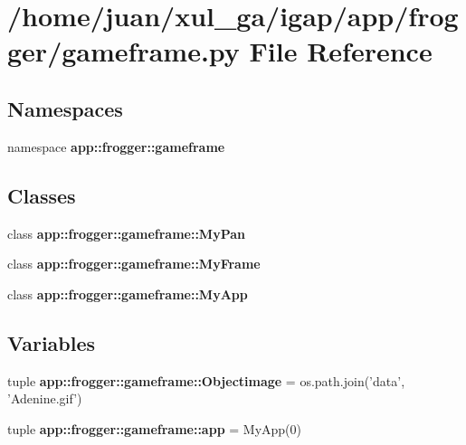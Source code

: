 \section{/home/juan/xul\_\-ga/igap/app/frogger/gameframe.py File Reference}
\label{gameframe_8py}
\subsection*{Namespaces}
\begin{CompactItemize}
\item 
namespace {\bf app::frogger::gameframe}
\end{CompactItemize}
\subsection*{Classes}
\begin{CompactItemize}
\item 
class {\bf app::frogger::gameframe::MyPan}
\item 
class {\bf app::frogger::gameframe::MyFrame}
\item 
class {\bf app::frogger::gameframe::MyApp}
\end{CompactItemize}
\subsection*{Variables}
\begin{CompactItemize}
\item 
tuple {\bf app::frogger::gameframe::Objectimage} = os.path.join('data', 'Adenine.gif')
\item 
tuple {\bf app::frogger::gameframe::app} = MyApp(0)
\end{CompactItemize}
